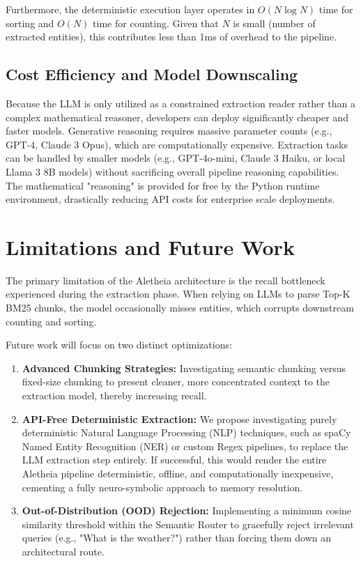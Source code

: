 \documentclass[journal,10pt]{IEEEtran}
\begin{document}
Furthermore, the deterministic execution layer operates in $O(N \log N)$ time for sorting and $O(N)$ time for counting. Given that $N$ is small (number of extracted entities), this contributes less than 1ms of overhead to the pipeline.

\subsection{Cost Efficiency and Model Downscaling}
Because the LLM is only utilized as a constrained extraction reader rather than a complex mathematical reasoner, developers can deploy significantly cheaper and faster models. Generative reasoning requires massive parameter counts (e.g., GPT-4, Claude 3 Opus), which are computationally expensive. Extraction tasks can be handled by smaller models (e.g., GPT-4o-mini, Claude 3 Haiku, or local Llama 3 8B models) without sacrificing overall pipeline reasoning capabilities. The mathematical "reasoning" is provided for free by the Python runtime environment, drastically reducing API costs for enterprise scale deployments.

\section{Limitations and Future Work}
The primary limitation of the Aletheia architecture is the recall bottleneck experienced during the extraction phase. When relying on LLMs to parse Top-K BM25 chunks, the model occasionally misses entities, which corrupts downstream counting and sorting. 

Future work will focus on two distinct optimizations:
\begin{enumerate}
    \item \textbf{Advanced Chunking Strategies:} Investigating semantic chunking versus fixed-size chunking to present cleaner, more concentrated context to the extraction model, thereby increasing recall.
    \item \textbf{API-Free Deterministic Extraction:} We propose investigating purely deterministic Natural Language Processing (NLP) techniques, such as spaCy Named Entity Recognition (NER) or custom Regex pipelines, to replace the LLM extraction step entirely. If successful, this would render the entire Aletheia pipeline deterministic, offline, and computationally inexpensive, cementing a fully neuro-symbolic approach to memory resolution.
    \item \textbf{Out-of-Distribution (OOD) Rejection:} Implementing a minimum cosine similarity threshold within the Semantic Router to gracefully reject irrelevant queries (e.g., "What is the weather?") rather than forcing them down an architectural route.
\end{enumerate}
\end{document}
